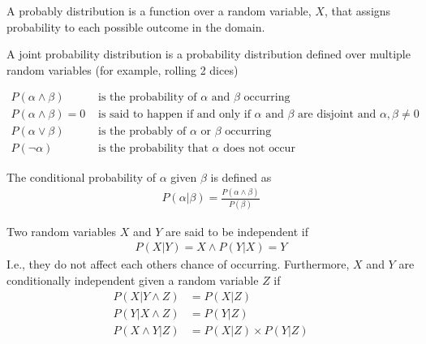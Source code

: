 \documentclass[a4paper]{article}
\theoremstyle{plain}
\theoremstyle{definition}
\newtheorem{defn}{Definition}[section]
\theoremstyle{remark}
\begin{document}
\begin{tcolorbox}[colback=black!3!white,colframe=black!60!white,title=\begin{defn}Probability Distribution \label{Probability Distribution}\end{defn}]
A probably distribution is a function over a random variable, $X$, that assigns probability to each possible outcome in the domain.
\end{tcolorbox}
\begin{tcolorbox}[colback=black!3!white,colframe=black!60!white,title=\begin{defn}Joint Probability Distribution \label{Joint Probability Distribution}\end{defn}]
A joint probability distribution is a probability distribution defined over multiple random variables (for example, rolling 2 dices)
\end{tcolorbox}
 \begin{align*}
	 P(\alpha \land \beta) & \text{ is the probability of $\alpha$ and $\beta$ occurring} \\
	 P(\alpha \land \beta ) = 0 & \text{ is said to happen if and only if $\alpha$ and $\beta$ are disjoint and $\alpha,\beta \neq 0$}\\
	 P(\alpha \lor \beta) & \text{ is the probably of $\alpha$ or $\beta$ occurring} \\
	 P(\neg \alpha)&\text{ is the probability that $\alpha$ does not occur}
\end{align*}
\begin{tcolorbox}[colback=black!3!white,colframe=black!60!white,title=\begin{defn}Conditional Probability \label{Conditional Probability}\end{defn}]
The conditional probability of $\alpha$ given $\beta$ is defined as
\begin{align}
P(\alpha|\beta) = \frac{P(\alpha \land \beta)}{P(\beta)}
\end{align}
\end{tcolorbox}
\begin{tcolorbox}[colback=black!3!white,colframe=black!60!white,title=\begin{defn}Independence \label{Independence}\end{defn}]
Two random variables $X$ and $Y$ are said to be independent if
\begin{align}
P(X|Y) = X \land P(Y|X) = Y
\end{align}
I.e., they do not affect each others chance of occurring. Furthermore, $X$ and $Y$ are conditionally independent given a random variable $Z$ if
\begin{align*}
	P(X|Y \land Z) &= P(X|Z) \\
	P(Y|X \land Z) &= P(Y|Z) \\
	P(X \land Y | Z) &= P(X|Z) \times P(Y|Z)
\end{align*}
\end{tcolorbox}
\end{document}
